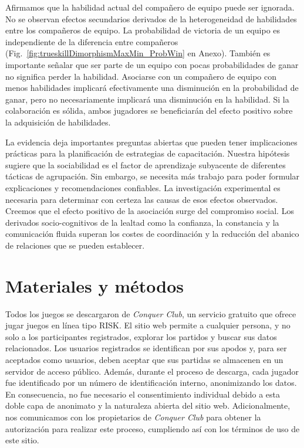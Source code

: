 \documentclass[a4paper,11pt]{book}
\theoremstyle{definition}
\begin{document}

Afirmamos que la habilidad actual del compa\~nero de equipo puede ser ignorada.
%
No se observan efectos secundarios derivados de la heterogeneidad de habilidades entre los compa\~neros de equipo.
%
La probabilidad de victoria de un equipo es independiente de la diferencia entre compa\~neros (Fig.~\ref{fig:trueskillDimorphismMaxMin_ProbWin} en Anexo).
%
Tambi\'en es importante se\~nalar que ser parte de un equipo con pocas probabilidades de ganar no significa perder la habilidad.
%
Asociarse con un compa\~nero de equipo con menos habilidades implicar\'a efectivamente una disminuci\'on en la probabilidad de ganar, pero no necesariamente implicar\'a una disminuci\'on en la habilidad.
%
Si la colaboraci\'on es s\'olida, ambos jugadores se beneficiar\'an del efecto positivo sobre la adquisici\'on de habilidades.


La evidencia deja importantes preguntas abiertas que pueden tener implicaciones pr\'acticas para la planificaci\'on de estrategias de capacitaci\'on.
%
Nuestra hip\'otesis sugiere que la sociabilidad es el factor de aprendizaje subyacente de diferentes t\'acticas de agrupaci\'on.
%
Sin embargo, se necesita m\'as trabajo para poder formular explicaciones y recomendaciones confiables.
%
La investigaci\'on experimental es necesaria para determinar con certeza las causas de esos efectos observados.
%
Creemos que el efecto positivo de la asociaci\'on surge del compromiso social.
%
Los derivados socio-cognitivos de la lealtad como la confianza, la constancia y la comunicaci\'on fluida superan los costes de coordinaci\'on y la reducci\'on del abanico de relaciones que se pueden establecer.

\section{Materiales y m\'etodos}

Todos los juegos se descargaron de \emph{Conquer Club}, un servicio gratuito que ofrece jugar juegos en l\'inea tipo RISK.
%
El sitio web permite a cualquier persona, y no solo a los participantes registrados, explorar los partidos y buscar sus datos relacionados.
%
Los usuarios registrados se identifican por sus apodos y, para ser aceptados como usuarios, deben aceptar que sus partidas se almacenen en un servidor de acceso p\'ublico.
%
Adem\'as, durante el proceso de descarga, cada jugador fue identificado por un n\'umero de identificaci\'on interno, anonimizando los datos.
%
En consecuencia, no fue necesario el consentimiento individual debido a esta doble capa de anonimato y la naturaleza abierta del sitio web.
%
Adicionalmente, nos comunicamos con los propietarios de \emph{Conquer Club} para obtener la autorizaci\'on para realizar este proceso, cumpliendo as\'i con los t\'erminos de uso de este sitio.
\end{document}
